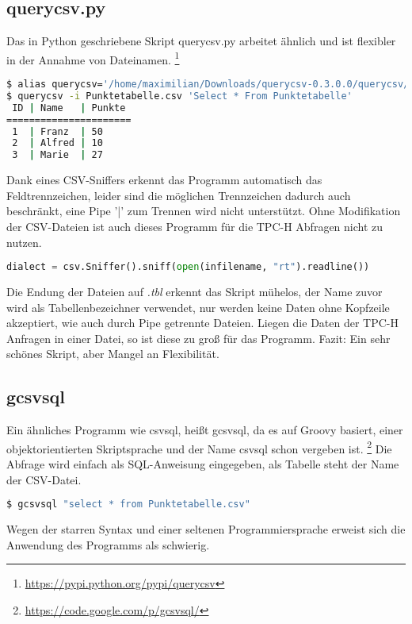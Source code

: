 \subsection{querycsv.py}
Das in Python geschriebene Skript querycsv.py arbeitet ähnlich und ist flexibler in der Annahme von Dateinamen.
\footnote{\url{https://pypi.python.org/pypi/querycsv}}

\begin{lstlisting}[language=Bash]
$ alias querycsv='/home/maximilian/Downloads/querycsv-0.3.0.0/querycsv/querycsv.py'
$ querycsv -i Punktetabelle.csv 'Select * From Punktetabelle'
 ID | Name   | Punkte
======================
 1  | Franz  | 50    
 2  | Alfred | 10    
 3  | Marie  | 27  
\end{lstlisting}

Dank eines CSV-Sniffers erkennt das Programm automatisch das Feldtrennzeichen, leider sind die möglichen Trennzeichen dadurch auch beschränkt, eine Pipe '|' zum Trennen wird nicht unterstützt. Ohne Modifikation der CSV-Dateien ist auch dieses Programm für die TPC-H Abfragen nicht zu nutzen.
\begin{lstlisting}[language=Python]
dialect = csv.Sniffer().sniff(open(infilename, "rt").readline())
\end{lstlisting}
Die Endung der Dateien auf \textit{.tbl} erkennt das Skript mühelos, der Name zuvor wird als Tabellenbezeichner verwendet, nur werden keine Daten ohne Kopfzeile akzeptiert, wie auch durch Pipe getrennte Dateien. Liegen die Daten der TPC-H Anfragen in einer Datei, so ist diese zu groß für das Programm. Fazit: Ein sehr schönes Skript, aber Mangel an Flexibilität.

\subsection{gcsvsql}
Ein ähnliches Programm wie csvsql, heißt gcsvsql, da es auf Groovy basiert, einer objektorientierten Skriptsprache und der Name csvsql schon vergeben ist.
\footnote{\url{https://code.google.com/p/gcsvsql/}}
Die Abfrage wird einfach als SQL-Anweisung eingegeben, als Tabelle steht der Name der CSV-Datei.
\begin{lstlisting}[language=Bash]
$ gcsvsql "select * from Punktetabelle.csv"
\end{lstlisting}

Wegen der starren Syntax und einer seltenen Programmiersprache erweist sich die Anwendung des Programms als schwierig.

